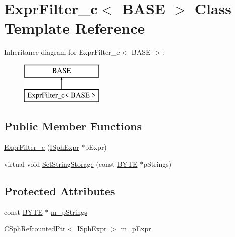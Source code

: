 \hypertarget{classExprFilter__c}{\section{Expr\-Filter\-\_\-c$<$ B\-A\-S\-E $>$ Class Template Reference}
\label{classExprFilter__c}
}
Inheritance diagram for Expr\-Filter\-\_\-c$<$ B\-A\-S\-E $>$\-:\begin{figure}[H]
\begin{center}
\leavevmode
\includegraphics[height=2.000000cm]{classExprFilter__c}
\end{center}
\end{figure}
\subsection*{Public Member Functions}
\begin{DoxyCompactItemize}
\item 
\hyperlink{classExprFilter__c_a9fd13ba82fec0d51cee15797c12cef4c}{Expr\-Filter\-\_\-c} (\hyperlink{structISphExpr}{I\-Sph\-Expr} $\ast$p\-Expr)
\item 
virtual void \hyperlink{classExprFilter__c_af9a0f991394dc7c78517877167a5af5e}{Set\-String\-Storage} (const \hyperlink{sphinxstd_8h_a4ae1dab0fb4b072a66584546209e7d58}{B\-Y\-T\-E} $\ast$p\-Strings)
\end{DoxyCompactItemize}
\subsection*{Protected Attributes}
\begin{DoxyCompactItemize}
\item 
const \hyperlink{sphinxstd_8h_a4ae1dab0fb4b072a66584546209e7d58}{B\-Y\-T\-E} $\ast$ \hyperlink{classExprFilter__c_a5de7adf4fd00f75657f4da64fa72d367}{m\-\_\-p\-Strings}
\item 
\hyperlink{classCSphRefcountedPtr}{C\-Sph\-Refcounted\-Ptr}$<$ \hyperlink{structISphExpr}{I\-Sph\-Expr} $>$ \hyperlink{classExprFilter__c_a10ab142f3d802a2d7d7b0d0bbc47fc51}{m\-\_\-p\-Expr}
\end{DoxyCompactItemize}



